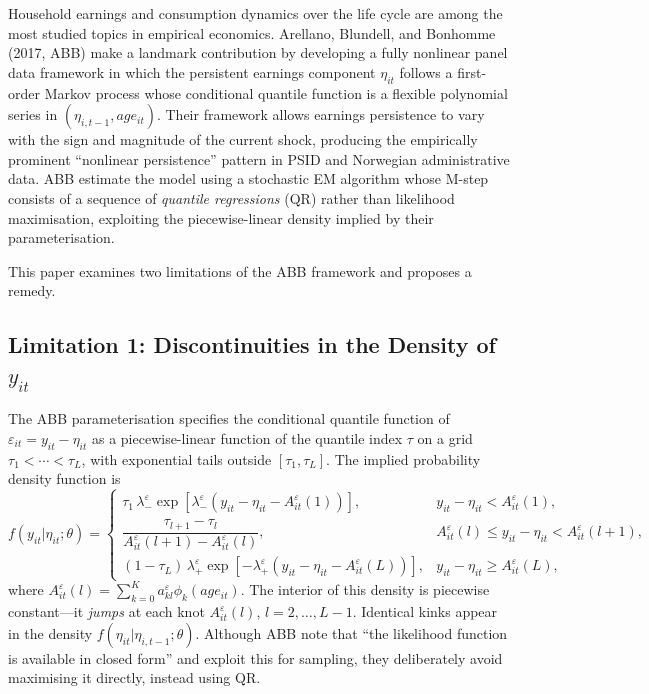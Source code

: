 \documentclass[12pt]{article}
\begin{document}
Household earnings and consumption dynamics over the life cycle are among the
most studied topics in empirical economics.
Arellano, Blundell, and Bonhomme (2017, ABB) make a landmark contribution by
developing a fully nonlinear panel data framework in which the persistent
earnings component $\eta_{it}$ follows a first-order Markov process whose
conditional quantile function is a flexible polynomial series in
$(\eta_{i,t-1}, age_{it})$.
Their framework allows earnings persistence to vary with the sign and magnitude
of the current shock, producing the empirically prominent ``nonlinear
persistence'' pattern in PSID and Norwegian administrative data.
ABB estimate the model using a stochastic EM algorithm whose M-step consists of
a sequence of \emph{quantile regressions} (QR) rather than likelihood
maximisation, exploiting the piecewise-linear density implied by their
parameterisation.

This paper examines two limitations of the ABB framework and proposes a remedy.

\subsection*{Limitation 1: Discontinuities in the Density of $y_{it}$}

The ABB parameterisation specifies the conditional quantile function of
$\varepsilon_{it}=y_{it}-\eta_{it}$ as a piecewise-linear function of the
quantile index $\tau$ on a grid $\tau_1<\cdots<\tau_L$, with exponential
tails outside $[\tau_1,\tau_L]$.
The implied probability density function is
\begin{equation}\label{eq:eps_pdf}
f(y_{it}|\eta_{it};\theta)=\begin{cases}
\tau_1\,\lambda_-^\varepsilon\exp[\lambda_-^\varepsilon(y_{it}-\eta_{it}-A^\varepsilon_{it}(1))],
  & y_{it}-\eta_{it}<A^\varepsilon_{it}(1),\\[4pt]
\dfrac{\tau_{l+1}-\tau_l}{A^\varepsilon_{it}(l+1)-A^\varepsilon_{it}(l)},
  & A^\varepsilon_{it}(l)\le y_{it}-\eta_{it}<A^\varepsilon_{it}(l+1),\\[4pt]
(1-\tau_L)\,\lambda_+^\varepsilon\exp[-\lambda_+^\varepsilon(y_{it}-\eta_{it}-A^\varepsilon_{it}(L))],
  & y_{it}-\eta_{it}\ge A^\varepsilon_{it}(L),
\end{cases}
\end{equation}
where $A^\varepsilon_{it}(l)=\sum_{k=0}^K a_{kl}^\varepsilon\phi_k(age_{it})$.
The interior of this density is piecewise constant---it \emph{jumps} at each
knot $A^\varepsilon_{it}(l)$, $l=2,\ldots,L-1$.
Identical kinks appear in the density $f(\eta_{it}|\eta_{i,t-1};\theta)$.
Although ABB note that ``the likelihood function is available in closed form''
and exploit this for sampling, they deliberately avoid maximising it directly,
instead using QR.
\end{document}
